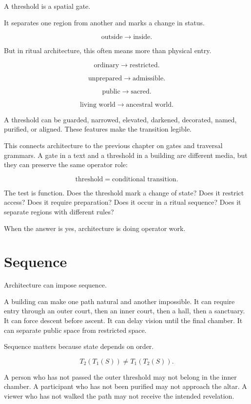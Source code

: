 \documentclass[11pt]{book}
\begin{document}
A threshold is a spatial gate.

It separates one region from another and marks a change in status.

\[
\text{outside} \rightarrow \text{inside}.
\]

But in ritual architecture, this often means more than physical entry.

\[
\text{ordinary} \rightarrow \text{restricted}.
\]

\[
\text{unprepared} \rightarrow \text{admissible}.
\]

\[
\text{public} \rightarrow \text{sacred}.
\]

\[
\text{living world} \rightarrow \text{ancestral world}.
\]

A threshold can be guarded, narrowed, elevated, darkened, decorated, named, purified, or aligned. These features make the transition legible.

This connects architecture to the previous chapter on gates and traversal grammars. A gate in a text and a threshold in a building are different media, but they can preserve the same operator role:

\[
\text{threshold} = \text{conditional transition}.
\]

The test is function. Does the threshold mark a change of state? Does it restrict access? Does it require preparation? Does it occur in a ritual sequence? Does it separate regions with different rules?

When the answer is yes, architecture is doing operator work.

\section{Sequence}

Architecture can impose sequence.

A building can make one path natural and another impossible. It can require entry through an outer court, then an inner court, then a hall, then a sanctuary. It can force descent before ascent. It can delay vision until the final chamber. It can separate public space from restricted space.

Sequence matters because state depends on order.

\[
T_2(T_1(S)) \neq T_1(T_2(S)).
\]

A person who has not passed the outer threshold may not belong in the inner chamber. A participant who has not been purified may not approach the altar. A viewer who has not walked the path may not receive the intended revelation.
\end{document}
